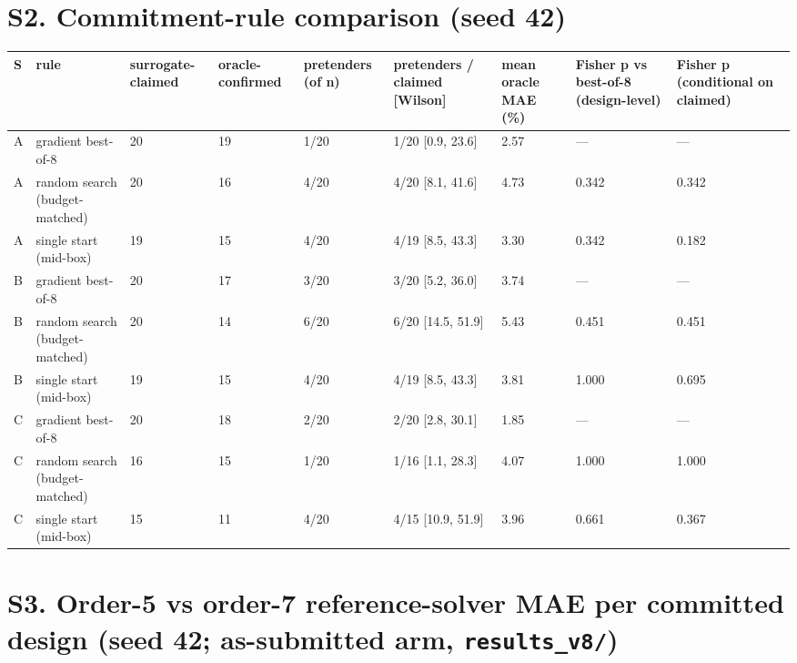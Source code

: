 \documentclass[11pt,a4paper]{article}
\newcounter{none}   %
\begin{document}
\section*{S2. Commitment-rule comparison (seed 42)}

\begin{landscape}
\begingroup
\setlength{\tabcolsep}{2pt}\tiny
{}
\label{tab:2}
{\def\LTcaptype{none} %
\begin{longtable}[]{@{}lllllllll@{}}
\toprule\noalign{}
S & rule & surrogate-claimed & oracle-confirmed & pretenders (of n) & pretenders / claimed {[}Wilson{]} & mean oracle MAE (\%) & Fisher p vs best-of-8 (design-level) & Fisher p (conditional on claimed) \\
\midrule\noalign{}
\endhead
\bottomrule\noalign{}
\endlastfoot
A & gradient best-of-8 & 20 & 19 & 1/20 & 1/20 {[}0.9, 23.6{]} & 2.57 & --- & --- \\
A & random search (budget-matched) & 20 & 16 & 4/20 & 4/20 {[}8.1, 41.6{]} & 4.73 & 0.342 & 0.342 \\
A & single start (mid-box) & 19 & 15 & 4/20 & 4/19 {[}8.5, 43.3{]} & 3.30 & 0.342 & 0.182 \\
B & gradient best-of-8 & 20 & 17 & 3/20 & 3/20 {[}5.2, 36.0{]} & 3.74 & --- & --- \\
B & random search (budget-matched) & 20 & 14 & 6/20 & 6/20 {[}14.5, 51.9{]} & 5.43 & 0.451 & 0.451 \\
B & single start (mid-box) & 19 & 15 & 4/20 & 4/19 {[}8.5, 43.3{]} & 3.81 & 1.000 & 0.695 \\
C & gradient best-of-8 & 20 & 18 & 2/20 & 2/20 {[}2.8, 30.1{]} & 1.85 & --- & --- \\
C & random search (budget-matched) & 16 & 15 & 1/20 & 1/16 {[}1.1, 28.3{]} & 4.07 & 1.000 & 1.000 \\
C & single start (mid-box) & 15 & 11 & 4/20 & 4/15 {[}10.9, 51.9{]} & 3.96 & 0.661 & 0.367 \\
\end{longtable}
}
\endgroup
\end{landscape}

\section*{\texorpdfstring{S3. Order-5 vs order-7 reference-solver MAE per committed design (seed 42; \textbf{as-submitted arm}, \texttt{results\_v8/})}{S3. Order-5 vs order-7 reference-solver MAE per committed design (seed 42; as-submitted arm, results\_v8/)}}
\end{document}
